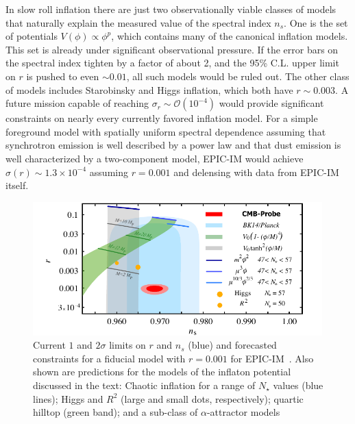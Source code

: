 In slow roll inflation there are just two observationally viable classes of models that naturally explain the measured value of the spectral index $n_s$. 
One is the set of potentials $V(\phi)\propto\phi^p$, which contains many of the canonical inflation models. This 
set is already under significant observational pressure. If the error bars on the spectral index tighten by a factor of about 2, 
and the 95\% C.L. upper limit on $r$ is pushed to even $\sim0.01$, all such models would be ruled out. 
The other class of models includes Starobinsky and Higgs inflation, which both have $r\sim0.003$. A future mission 
capable of reaching $\sigma_r\sim\mathcal{O}(10^{-4})$ would provide significant constraints on nearly every currently favored 
inflation model. For a simple foreground model with spatially uniform spectral dependence assuming that synchrotron emission is well described by a power law and that dust emission is well characterized by a two-component model, EPIC-IM would achieve $\sigma(r)\sim1.3 \times 10^{-4}$ assuming $r=0.001$ and delensing with data from EPIC-IM itself. 
\begin{figure}[ht!]
\parbox{4.in}{\centerline {
\includegraphics[width=4.4in]{figs/nsrlabeledrp001v2} } }
\hspace{-0.05in}
\parbox{2.5in}{
\caption{ \small \setlength{\baselineskip}{0.95\baselineskip}
Current $1$ and $2\sigma $ limits on $r$ and $n_{s}$ (blue) and forecasted constraints for a fiducial model with $r=0.001$ for 
EPIC-IM~\cite{Array:2015xqh}. Also shown are predictions 
for the models of the inflaton potential discussed in the text: Chaotic inflation for a range of $N_\star$ values (blue lines); 
Higgs and $R^2$ (large and small dots, respectively);  quartic hilltop (green band); and a sub-class of $\alpha$-attractor
models~\cite{Kallosh:2013hoa}
\label{fig:nsrp001} } }
\vspace{-0.1in}
\end{figure}

